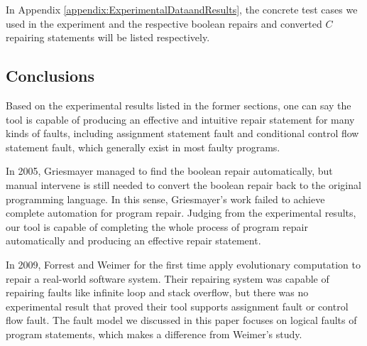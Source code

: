 In Appendix \ref{appendix:ExperimentalDataandResults}, the concrete test cases we used in the experiment and the respective boolean repairs and converted $C$ repairing statements will be listed respectively.

\subsection{Conclusions}
Based on the experimental results listed in the former sections, one can say the tool is capable of producing an effective and intuitive repair statement for many kinds of faults, including assignment statement fault and conditional control flow statement fault, which generally exist in most faulty programs.

In 2005, Griesmayer managed to find the boolean repair automatically\cite{RoBPwaAtC}, but manual intervene is still needed to convert the boolean repair back to the original programming language. In this sense, Griesmayer's work failed to achieve complete automation for program repair.
Judging from the experimental results, our tool is capable of completing the whole process of program repair automatically and producing an effective repair statement.

In 2009,  Forrest and Weimer for the first time apply evolutionary computation to repair a real-world software system\cite{AFPUGP}. Their repairing system was capable of repairing faults like
infinite loop and stack overflow, but there was no experimental result that proved their tool supports assignment fault or control flow fault.
The fault model we discussed in this paper focuses on logical faults of program statements, which makes a difference from Weimer's study.
